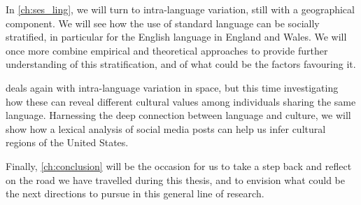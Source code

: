 \documentclass[../thesis.tex]{subfiles}
\begin{document}
In \cref{ch:ses_ling}, we will turn to intra-language variation, still with a
geographical component.
We will see how the use of standard language can be socially stratified, in particular for the English language in England and Wales.
We will once more combine empirical and theoretical approaches to provide further understanding of this stratification, and of what could be the factors favouring it.

 deals again with intra-language variation in space, but this time
investigating how these can reveal different cultural values among individuals sharing
the same language.
Harnessing the deep connection between language and culture, we will show how a lexical analysis of social media posts can help us infer cultural regions of the United States.

Finally, \cref{ch:conclusion} will be the occasion for us to take a step back and reflect on the road
we have travelled during this thesis, and to envision what could be the next directions to pursue in this general line of research.
\end{document}
